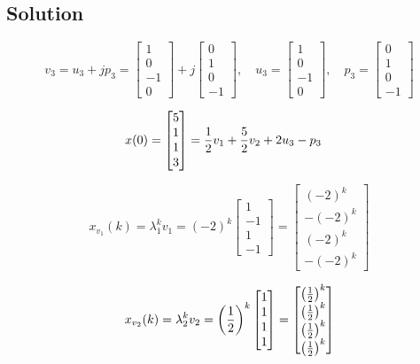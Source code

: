 \documentclass[12pt,a4paper]{article}
\begin{document}
\subsection*{Solution}

\[
v_3 = u_3 + jp_3 = \begin{bmatrix}
	1 \\ 0 \\ -1 \\ 0
\end{bmatrix} + j\begin{bmatrix}
0  \\ 1 \\ 0 \\ -1
\end{bmatrix}, \quad u_3 = \begin{bmatrix}
1 \\ 0 \\ -1 \\ 0
\end{bmatrix}, \quad p_3 = \begin{bmatrix}
0 \\ 1 \\ 0 \\ -1
\end{bmatrix}
\]

\begin{align*}
	x(0) &= \begin{bmatrix}
		5 \\ 1\\1\\3
	\end{bmatrix} = {1\over2} v_1 + {5\over2}v_2 + 2u_3 - p_3
\end{align*}

\[
x_{v_1}(k) = \lambda_1^k v_1 = (-2)^k \begin{bmatrix}
	1 \\ -1 \\ 1\\ -1
\end{bmatrix} = \begin{bmatrix}
(-2)^k \\ - (-2)^k \\ (-2)^k \\ -(-2)^k
\end{bmatrix}
\]

\[
x_{v_2}(k) = \lambda_2^k v_2 = \left({1\over2}\right)^k\begin{bmatrix}
	1 \\ 1\\1\\1
\end{bmatrix} = \begin{bmatrix}
\left({1\over2}\right)^k\\\left({1\over2}\right)^k\\\left({1\over2}\right)^k\\\left({1\over2}\right)^k
\end{bmatrix}
\]
\end{document}
